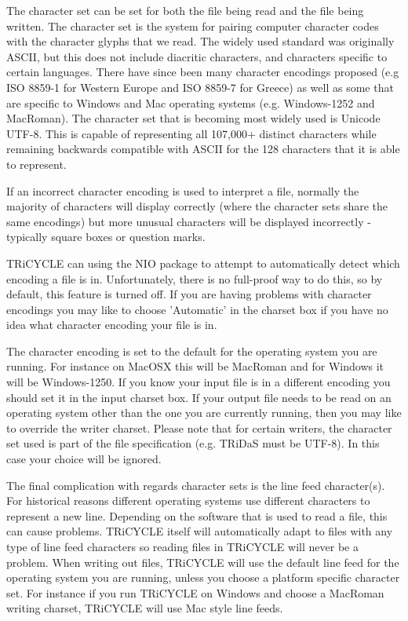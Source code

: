 \documentclass[10pt, headsepline,DIV14,BCOR0.5cm]{scrreprt}
\begin{document}
The character set can be set for both the file being read and the file being written. The character set is
the system for pairing computer character codes with the character glyphs that we read. The widely
used standard was originally ASCII, but this does not include diacritic characters, and characters specific
to certain languages. There have since been many character encodings proposed (e.g ISO 8859-1 for
Western Europe and ISO 8859-7 for Greece) as well as some that are specific to Windows and Mac
operating systems (e.g. Windows-1252 and MacRoman). The character set that is becoming most widely
used is Unicode UTF-8. This is capable of representing all 107,000+ distinct characters while remaining
backwards compatible with ASCII for the 128 characters that it is able to represent.

If an incorrect character encoding is used to interpret a file, normally the majority of characters will display
correctly (where the character sets share the same encodings) but more unusual characters will be displayed
incorrectly - typically square boxes or question marks.

TRiCYCLE can using the NIO package to attempt to automatically detect which encoding a file is in.
Unfortunately, there is no full-proof way to do this, so by default, this feature is turned off. If you are
having problems with character encodings you may like to choose 'Automatic' in the charset box if you
have no idea what character encoding your file is in.

The character encoding is set to the default for the operating system you are running. For instance on
MacOSX this will be MacRoman and for Windows it will be Windows-1250. If you know your input file
is in a different encoding you should set it in the input charset box. If your output file needs to be read
on an operating system other than the one you are currently running, then you may like to override the
writer charset. Please note that for certain writers, the character set used is part of the file specification
(e.g. TRiDaS must be UTF-8). In this case your choice will be ignored.

The final complication with regards character sets is the line feed character(s). For historical reasons
different operating systems use different characters to represent a new line. Depending on the software
that is used to read a file, this can cause problems. TRiCYCLE itself will automatically adapt to files with
any type of line feed characters so reading files in TRiCYCLE will never be a problem. When writing
out files, TRiCYCLE will use the default line feed for the operating system you are running, unless you
choose a platform specific character set. For instance if you run TRiCYCLE on Windows and choose a
MacRoman writing charset, TRiCYCLE will use Mac style line feeds.
\end{document}
